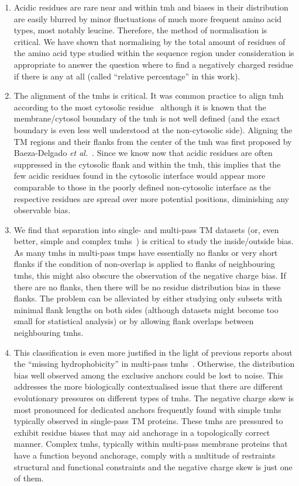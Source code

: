 \begin{enumerate}[i]
  \item Acidic residues are rare near and within \gls{tmh} and biases in their distribution are easily blurred by minor fluctuations of much more frequent amino acid types, most notably leucine. Therefore, the method of normalisation is critical. We have shown that normalising by the total amount of residues of the amino acid type studied within the sequence region under consideration is appropriate to answer the question where to find a negatively charged residue if there is any at all (called “relative percentage” in this work).
  \item The alignment of the \gls{tmh}s is critical. It was common practice to align \gls{tmh} according to the most cytosolic residue~\cite{Sharpe2010} although it is known that the membrane/cytosol boundary of the \gls{tmh} is not well defined (and the exact boundary is even less well understood at the non-cytosolic side). Aligning the TM regions and their flanks from the center of the \gls{tmh} was first proposed by Baeza-Delgado \textit{et al.}~\cite{Baeza-Delgado2013}. Since we know now that acidic residues are often suppressed in the cytosolic flank and within the \gls{tmh}, this implies that the few acidic residues found in the cytosolic interface would appear more comparable to those in the poorly defined non-cytosolic interface as the respective residues are spread over more potential positions, diminishing any observable bias.
  \item We find that separation into single- and multi-pass TM datasets (or, even better, simple and complex \gls{tmh}s~\cite{Wong2011, Wong2012}) is critical to study the inside/outside bias. As many \gls{tmh}s in multi-pass \gls{tmp}s have essentially no flanks or very short flanks if the condition of non-overlap is applied to flanks of neighbouring \gls{tmh}s, this might also obscure the observation of the negative charge bias. If there are no flanks, then there will be no residue distribution bias in these flanks. The problem can be alleviated by either studying only subsets with minimal flank lengths on both sides (although datasets might become too small for statistical analysis) or by allowing flank overlaps between neighbouring \gls{tmh}s.
  \item This classification is even more justified in the light of previous reports about the “missing hydrophobicity” in multi-pass \gls{tmh}s~\cite{Nilsson1990, Hedin2010, Hessa2007, Ojemalm2012}. Otherwise, the distribution bias well observed among the exclusive anchors could be lost to noise.  This addresses the more biologically contextualised issue that there are different evolutionary pressures on different types of \gls{tmh}s. The negative charge skew is most pronounced for dedicated anchors frequently found with simple \gls{tmh}s typically observed in single-pass TM proteins. These \gls{tmh}s are pressured to exhibit residue biases that may aid anchorage in a topologically correct manner. Complex \gls{tmh}s, typically within multi-pass membrane proteins that have a function beyond anchorage, comply with a multitude of restraints structural and functional constraints and the negative charge skew is just one of them.
\end{enumerate}

